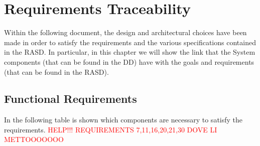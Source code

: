 \documentclass[a4paper, 12pt, oneside, table]{article}
\newcommand{\yasmin}[1]{\textcolor{Red}{#1}}
\begin{document}
\newpage
\section{Requirements Traceability}
Within the following document, the design and architectural choices have been made in order to satisfy the requirements and the various specifications contained in the RASD. In particular, in this chapter we will show the link that the System components (that can be found in the DD) have with the goals and requirements (that can be found in the RASD).
\subsection{Functional Requirements}
In the following table is shown which components are necessary to satisfy the requirements. \yasmin{HELP!!! REQUIREMENTS 7,11,16,20,21,30 DOVE LI METTOOOOOOO}
\end{document}
